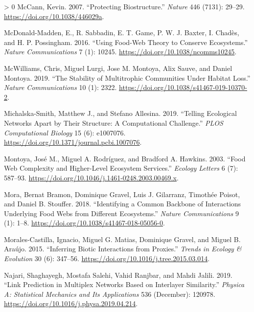 \documentclass[10pt,oneside]{article}
\newlength{\cslhangindent}
\newenvironment{CSLReferences}[3] %
 {%
  \setlength{\parindent}{0pt}
  \ifodd #1 \everypar{\setlength{\hangindent}{\cslhangindent}}\ignorespaces\fi
  \ifnum #2 > 0
  \setlength{\parskip}{#2\baselineskip}
  \fi
 }%
 {}
\begin{document}
\begin{CSLReferences}{1}{0}
\leavevmode\hypertarget{ref-McCann2007ProBio}{}%
McCann, Kevin. 2007. {``Protecting Biostructure.''} \emph{Nature} 446
(7131): 29--29. \url{https://doi.org/10.1038/446029a}.

\leavevmode\hypertarget{ref-McDonald-Madden2016UsiFoo}{}%
McDonald-Madden, E., R. Sabbadin, E. T. Game, P. W. J. Baxter, I.
Chadès, and H. P. Possingham. 2016. {``Using Food-Web Theory to Conserve
Ecosystems.''} \emph{Nature Communications} 7 (1): 10245.
\url{https://doi.org/10.1038/ncomms10245}.

\leavevmode\hypertarget{ref-McWilliams2019StaMul}{}%
McWilliams, Chris, Miguel Lurgi, Jose M. Montoya, Alix Sauve, and Daniel
Montoya. 2019. {``The Stability of Multitrophic Communities Under
Habitat Loss.''} \emph{Nature Communications} 10 (1): 2322.
\url{https://doi.org/10.1038/s41467-019-10370-2}.

\leavevmode\hypertarget{ref-Michalska-Smith2019TelEco}{}%
Michalska-Smith, Matthew J., and Stefano Allesina. 2019. {``Telling
Ecological Networks Apart by Their Structure: A Computational
Challenge.''} \emph{PLOS Computational Biology} 15 (6): e1007076.
\url{https://doi.org/10.1371/journal.pcbi.1007076}.

\leavevmode\hypertarget{ref-Montoya2003FooWeb}{}%
Montoya, José M., Miguel A. Rodríguez, and Bradford A. Hawkins. 2003.
{``Food Web Complexity and Higher-Level Ecosystem Services.''}
\emph{Ecology Letters} 6 (7): 587--93.
\url{https://doi.org/10.1046/j.1461-0248.2003.00469.x}.

\leavevmode\hypertarget{ref-Mora2018IdeCom}{}%
Mora, Bernat Bramon, Dominique Gravel, Luis J. Gilarranz, Timothée
Poisot, and Daniel B. Stouffer. 2018. {``Identifying a Common Backbone
of Interactions Underlying Food Webs from Different Ecosystems.''}
\emph{Nature Communications} 9 (1): 1--8.
\url{https://doi.org/10.1038/s41467-018-05056-0}.

\leavevmode\hypertarget{ref-Morales-Castilla2015InfBio}{}%
Morales-Castilla, Ignacio, Miguel G. Matias, Dominique Gravel, and
Miguel B. Araújo. 2015. {``Inferring Biotic Interactions from
Proxies.''} \emph{Trends in Ecology \& Evolution} 30 (6): 347--56.
\url{https://doi.org/10.1016/j.tree.2015.03.014}.

\leavevmode\hypertarget{ref-Najari2019LinPre}{}%
Najari, Shaghayegh, Mostafa Salehi, Vahid Ranjbar, and Mahdi Jalili.
2019. {``Link Prediction in Multiplex Networks Based on Interlayer
Similarity.''} \emph{Physica A: Statistical Mechanics and Its
Applications} 536 (December): 120978.
\url{https://doi.org/10.1016/j.physa.2019.04.214}.


\end{CSLReferences}
\end{document}
